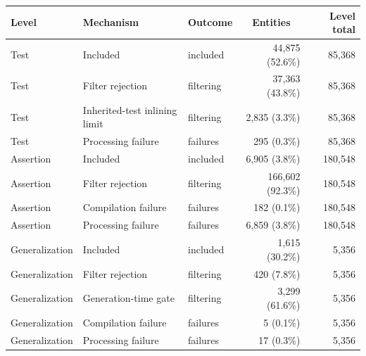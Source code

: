   \renewcommand{\theHreporttablerow}{rq6_exclusion_mechanisms.\arabic{reporttablerow}}
  \setcounter{reporttablerow}{0}
  \begin{tabular*}{\linewidth}{@{\hspace{\tabcolsep}\extracolsep{\fill}}lllrr}
  \toprule
  Level & Mechanism & Outcome & \multicolumn{1}{c}{Entities} & Level total \\
  \midrule
  {reporttablerow}\label{tabrow:rq6_exclusion_mechanisms:test.included}Test & Included & included & 44,875\; (52.6\%) & 85,368 \\
  {reporttablerow}\label{tabrow:rq6_exclusion_mechanisms:test.filter_rejection}Test & Filter rejection & filtering & 37,363\; (43.8\%) & 85,368 \\
  {reporttablerow}\label{tabrow:rq6_exclusion_mechanisms:test.inherited_test_inlining_limit}Test & Inherited-test inlining limit & filtering & 2,835\; (\phantom{0}3.3\%) & 85,368 \\
  {reporttablerow}\label{tabrow:rq6_exclusion_mechanisms:test.task_exception}Test & Processing failure & failures & 295\; (\phantom{0}0.3\%) & 85,368 \\
  \midrule
  {reporttablerow}\label{tabrow:rq6_exclusion_mechanisms:assertion.included}Assertion & Included & included & 6,905\; (\phantom{0}3.8\%) & 180,548 \\
  {reporttablerow}\label{tabrow:rq6_exclusion_mechanisms:assertion.filter_rejection}Assertion & Filter rejection & filtering & 166,602\; (92.3\%) & 180,548 \\
  {reporttablerow}\label{tabrow:rq6_exclusion_mechanisms:assertion.build_quarantine}Assertion & Compilation failure & failures & 182\; (\phantom{0}0.1\%) & 180,548 \\
  {reporttablerow}\label{tabrow:rq6_exclusion_mechanisms:assertion.task_exception}Assertion & Processing failure & failures & 6,859\; (\phantom{0}3.8\%) & 180,548 \\
  \midrule
  {reporttablerow}\label{tabrow:rq6_exclusion_mechanisms:generalization.included}Generalization & Included & included & 1,615\; (30.2\%) & 5,356 \\
  {reporttablerow}\label{tabrow:rq6_exclusion_mechanisms:generalization.filter_rejection}Generalization & Filter rejection & filtering & 420\; (\phantom{0}7.8\%) & 5,356 \\
  {reporttablerow}\label{tabrow:rq6_exclusion_mechanisms:generalization.generation_gate}Generalization & Generation-time gate & filtering & 3,299\; (61.6\%) & 5,356 \\
  {reporttablerow}\label{tabrow:rq6_exclusion_mechanisms:generalization.build_quarantine}Generalization & Compilation failure & failures & 5\; (\phantom{0}0.1\%) & 5,356 \\
  {reporttablerow}\label{tabrow:rq6_exclusion_mechanisms:generalization.task_exception}Generalization & Processing failure & failures & 17\; (\phantom{0}0.3\%) & 5,356 \\
  \bottomrule
  \end{tabular*}
